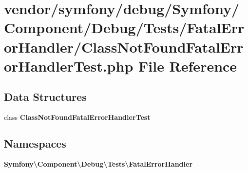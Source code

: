 \section{vendor/symfony/debug/\+Symfony/\+Component/\+Debug/\+Tests/\+Fatal\+Error\+Handler/\+Class\+Not\+Found\+Fatal\+Error\+Handler\+Test.php File Reference}
\label{_class_not_found_fatal_error_handler_test_8php}
\subsection*{Data Structures}
\begin{DoxyCompactItemize}
\item 
class {\bf Class\+Not\+Found\+Fatal\+Error\+Handler\+Test}
\end{DoxyCompactItemize}
\subsection*{Namespaces}
\begin{DoxyCompactItemize}
\item 
 {\bf Symfony\textbackslash{}\+Component\textbackslash{}\+Debug\textbackslash{}\+Tests\textbackslash{}\+Fatal\+Error\+Handler}
\end{DoxyCompactItemize}
